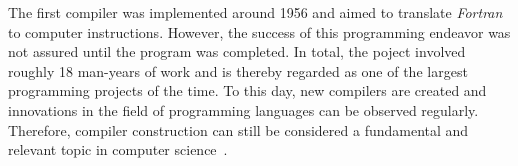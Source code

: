 The first compiler was implemented around 1956 and aimed to translate \emph{Fortran} to computer instructions.
However, the success of this programming endeavor was not assured until the program was completed.
In total, the poject involved roughly 18 man-years of work
and is thereby regarded as one of the largest programming projects of the time.
To this day, new compilers are created and innovations in the field of programming languages can be observed regularly.
Therefore, compiler construction can still be considered a fundamental and relevant topic in computer science~\cite[p.~6]{wirth_compiler_construction_2005}.
